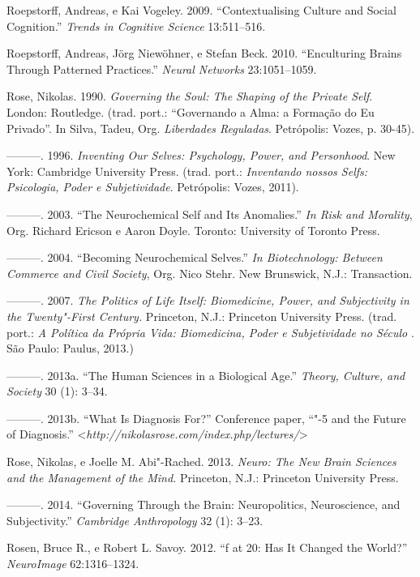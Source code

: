 Roepstorff, Andreas, e Kai Vogeley. 2009. ``Contextualising Culture and
Social Cognition.'' \emph{Trends in Cognitive Science} 13:511--516.

Roepstorff, Andreas, Jörg Niewöhner, e Stefan Beck. 2010. ``Enculturing
Brains Through Patterned Practices.'' \emph{Neural Networks}
23:1051--1059.

Rose, Nikolas. 1990. \emph{Governing the Soul: The Shaping of the
Private Self}. London: Routledge. (trad. port.: ``Governando a Alma: a
Formação do Eu Privado''. In Silva, Tadeu, Org. \emph{Liberdades
Reguladas}. Petrópolis: Vozes, p. 30-45).

---------. 1996. \emph{Inventing Our Selves: Psychology, Power, and
Personhood}. New York: Cambridge University Press. (trad. port.:
\emph{Inventando nossos Selfs: Psicologia, Poder e Subjetividade}.
Petrópolis: Vozes, 2011).

---------. 2003. ``The Neurochemical Self and Its Anomalies.'' \emph{In
Risk and Morality}, Org. Richard Ericson e Aaron Doyle. Toronto:
University of Toronto Press.

---------. 2004. ``Becoming Neurochemical Selves.'' \emph{In
Biotechnology: Between Commerce and Civil Society}, Org. Nico Stehr. New
Brunswick, N.J.: Transaction.

---------. 2007. \emph{The Politics of Life Itself: Biomedicine, Power,
and Subjectivity in the Twenty"-First Century.} Princeton, N.J.:
Princeton University Press. (trad. port.: \emph{A Política da Própria
Vida: Biomedicina, Poder e Subjetividade no Século }. São Paulo:
Paulus, 2013.)

---------. 2013a. ``The Human Sciences in a Biological Age.''
\emph{Theory, Culture, and Society} 30 (1): 3--34.

---------. 2013b. ``What Is Diagnosis For?'' Conference paper, ``"-5
and the Future of Diagnosis.''
\textless{}\emph{http://nikolasrose.com/index.php/lectures/}\textgreater{}

Rose, Nikolas, e Joelle M. Abi"-Rached. 2013. \emph{Neuro: The New Brain
Sciences and the Management of the Mind.} Princeton, N.J.: Princeton
University Press.

---------. 2014. ``Governing Through the Brain: Neuropolitics,
Neuroscience, and Subjectivity.'' \emph{Cambridge Anthropology} 32 (1):
3--23.

Rosen, Bruce R., e Robert L. Savoy. 2012. ``f at 20: Has It Changed
the World?'' \emph{NeuroImage} 62:1316--1324.

